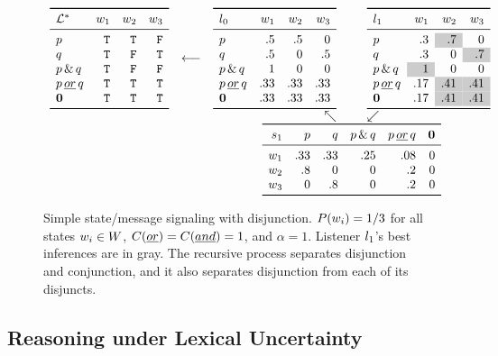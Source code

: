 \documentclass[12pt,twoside]{article}
\renewcommand{\_}{\textbf{\textunderscore\hspace{-4pt}\textunderscore\hspace{-3pt}\textunderscore\hspace{-4pt}\textunderscore}\hspace{0.5pt}}			%
\begin{document}
\begin{figure}[tp]
  \centering
  \setlength{\arraycolsep}{3pt} 
  $\begin{array}[b]{c c r@{\hspace{25pt}}l}
     \listenerMatrix%
     {\LexStar}%
     {\True & \True  & \False}%
     {\True & \False & \True}%
     {\True & \False & \False}%
     {\True & \True  & \True}%
     {\True & \True  & \True}%
     &
     \longleftarrow
     &
     \listenerMatrix%
     {\listenerZero}%
     { .5 &  .5 &   0}%
     { .5 &   0 &  .5}%
     {1   &   0 &   0}%
     {.33 & .33 & .33}%
     {.33 & .33 & .33}%
     &
     \listenerMatrix%
     {\listenerOne}%
     { .3 & \graycell{.7} &   0}%
     { .3 &   0 & \graycell{.7}}%
     {\graycell{1} &   0 &   0}%
     { .17 & \graycell{.41} & \graycell{.41}}%
     { .17 & \graycell{.41} & \graycell{.41}}%
   \\
   && \nwarrow & \swarrow
   \\
   &&
   \multicolumn{2}{c}{
      \speakerMatrix%
      {\speakerOne}%
      {.33 & .33 & .25 & .08 & 0}%
      {.8 & 0   &   0 & .2 & 0}%
      {  0 & .8 &   0 & .2 & 0}%
   }
   \end{array}$   
   \caption{Simple state/message signaling with disjunction. 
     $P(w_{i}) = 1/3$ for all states $w_{i} \in W$,
     $C(\emph{or}) = C(\emph{and}) = 1$, and 
     $\alpha = 1$. 
     Listener $l_{1}$'s best inferences are in gray. 
     The recursive process separates disjunction and conjunction, and 
     it also separates disjunction from each of its disjuncts.}
  \label{fig:rsa-disj}
\end{figure}


\subsection{Reasoning under Lexical Uncertainty}\label{sec:full}
\end{document}
